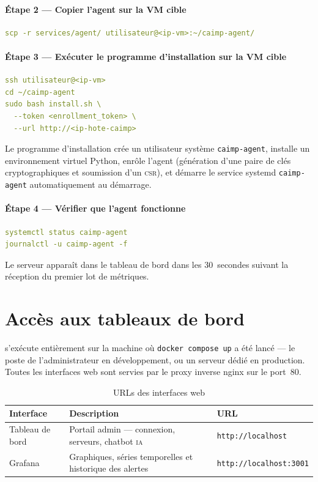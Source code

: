 \paragraph{Étape 2 — Copier l'agent sur la VM cible}
\begin{lstlisting}[language=YAML]
scp -r services/agent/ utilisateur@<ip-vm>:~/caimp-agent/
\end{lstlisting}

\paragraph{Étape 3 — Exécuter le programme d'installation sur la VM cible}
\begin{lstlisting}[language=YAML]
ssh utilisateur@<ip-vm>
cd ~/caimp-agent
sudo bash install.sh \
  --token <enrollment_token> \
  --url http://<ip-hote-caimp>
\end{lstlisting}

\noindent Le programme d'installation crée un utilisateur système
\texttt{caimp-agent}, installe un environnement virtuel Python, enrôle l'agent
(génération d'une paire de clés cryptographiques et soumission d'un \textsc{csr}),
et démarre le service systemd \texttt{caimp-agent} automatiquement au démarrage.

\paragraph{Étape 4 — Vérifier que l'agent fonctionne}
\begin{lstlisting}[language=YAML]
systemctl status caimp-agent
journalctl -u caimp-agent -f
\end{lstlisting}

\noindent Le serveur apparaît dans le tableau de bord \caimp{} dans les
30~secondes suivant la réception du premier lot de métriques.

\section{Accès aux tableaux de bord}

\caimp{} s'exécute entièrement sur la machine où \texttt{docker compose up} a
été lancé — le poste de l'administrateur en développement, ou un serveur dédié
en production. Toutes les interfaces web sont servies par le proxy inverse nginx
sur le port~80.

\begin{table}[H]
\centering
\caption{URLs des interfaces web}
\label{tab:web-urls}
\begin{tabularx}{\textwidth}{lXl}
\toprule
\textbf{Interface} & \textbf{Description} & \textbf{URL} \\
\midrule
Tableau de bord \caimp{} & Portail admin — connexion, serveurs, chatbot \textsc{ia}
  & \texttt{http://localhost} \\
Grafana & Graphiques, séries temporelles et historique des alertes
  & \texttt{http://localhost:3001} \\
\bottomrule
\end{tabularx}
\end{table}

